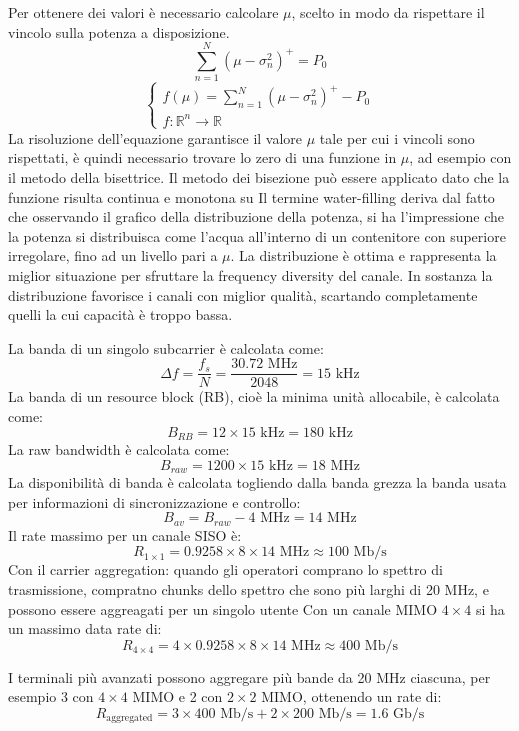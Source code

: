 Per ottenere dei valori è necessario calcolare $\mu$, scelto in modo da rispettare il vincolo sulla potenza a disposizione.
\[
    \sum_{n=1}^{N} (\mu - \sigma_n^2)^+ = P_0
\]
\[
    \begin{cases}
        f(\mu) = \sum_{n=1}^{N} (\mu - \sigma_n^2)^+ - P_0 \\
        f: \mathbb{R}^n \rightarrow \mathbb{R}
    \end{cases}
\]
La risoluzione dell'equazione garantisce il valore $\mu$ tale per cui i vincoli sono rispettati, è quindi necessario trovare lo zero di una funzione in $\mu$, ad esempio con il metodo della bisettrice.
Il metodo dei bisezione può essere applicato dato che la funzione risulta continua e monotona su%
Il termine water-filling deriva dal fatto che osservando il grafico della distribuzione della potenza, si ha l'impressione che la potenza si distribuisca come l'acqua all'interno di un contenitore con superiore irregolare, fino ad un livello pari a $\mu$.
La distribuzione è ottima e rappresenta la miglior situazione per sfruttare la frequency diversity del canale.
In sostanza la distribuzione favorisce i canali con miglior qualità, scartando completamente quelli la cui capacità è troppo bassa.






La banda di un singolo subcarrier è calcolata come:
\[
    \Delta f = \frac{f_s}{N} = \frac{30.72 \text{ MHz}}{2048} = 15 \text{ kHz}
\]
La banda di un resource block (RB), cioè la minima unità allocabile, è calcolata come:
\[
    B_{RB} = 12 \times 15 \text{ kHz} = 180 \text{ kHz}
\]
La raw bandwidth è calcolata come:
\[
B_{raw} = 1200 \times 15 \text{ kHz} = 18 \text{ MHz}
\]
La disponibilità di banda è calcolata togliendo dalla banda grezza la banda usata per informazioni di sincronizzazione e controllo:
\[
B_{av} = B_{raw} - 4 \text{ MHz} = 14 \text{ MHz}
\]
Il rate massimo per un canale SISO è:
\[
    R_{1 \times 1} = 0.9258 \times 8 \times 14 \text{ MHz} \approx 100 \text{ Mb/s}
\]
Con il carrier aggregation: quando gli operatori comprano lo spettro di trasmissione, compratno chunks dello spettro che sono più larghi di 20 MHz, e possono essere aggreagati per un singolo utente
Con un canale MIMO $4 \times 4$ si ha un massimo data rate di:
\[
    R_{4 \times 4} = 4 \times 0.9258 \times 8 \times 14 \text{ MHz} \approx 400 \text{ Mb/s}
\]


I terminali più avanzati possono aggregare più bande da 20 MHz ciascuna, per esempio 3 con $4 \times 4$ MIMO e 2 con $2 \times 2$ MIMO, ottenendo un rate di:
\[
    R_{\text{aggregated}} = 3 \times 400 \text{ Mb/s} + 2 \times 200 \text{ Mb/s} = 1.6 \text{ Gb/s}
\]


